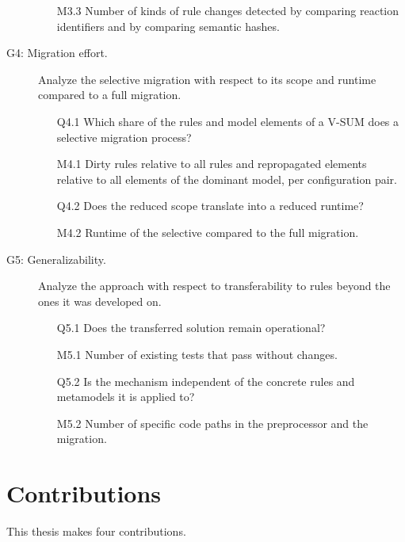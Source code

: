 \begin{description}
\begin{itemize}
                  \item[M3.3] Number of kinds of rule changes detected by comparing reaction identifiers and by comparing semantic hashes.
            \end{itemize}
      \item[G4: Migration effort.] \label{gqm:G4} Analyze the selective migration with respect to its scope and runtime compared to a full migration.
            \begin{itemize}
                  \item[Q4.1] Which share of the rules and model elements of a V-SUM does a selective migration process?
                  \item[M4.1] Dirty rules relative to all rules and repropagated elements relative to all elements of the dominant model, per configuration pair.
                  \item[Q4.2] Does the reduced scope translate into a reduced runtime?
                  \item[M4.2] Runtime of the selective compared to the full migration.
            \end{itemize}
      \item[G5: Generalizability.] \label{gqm:G5} Analyze the approach with respect to transferability to rules beyond the ones it was developed on.
            \begin{itemize}
                  \item[Q5.1] Does the transferred solution remain operational?
                  \item[M5.1] Number of existing tests that pass without changes.
                  \item[Q5.2] Is the mechanism independent of the concrete rules and metamodels it is applied to?
                  \item[M5.2] Number of specific code paths in the preprocessor and the migration.
            \end{itemize}
\end{description}

\section{Contributions}
\label{sec:Introduction:Contributions}

This thesis makes four contributions.


